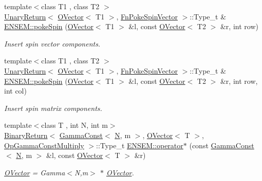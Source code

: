 \begin{DoxyCompactItemize}
{\footnotesize template$<$class T1 , class T2 $>$ }\\\mbox{\hyperlink{structENSEM_1_1UnaryReturn}{Unary\+Return}}$<$ \mbox{\hyperlink{classENSEM_1_1OVector}{O\+Vector}}$<$ T1 $>$, \mbox{\hyperlink{structENSEM_1_1FnPokeSpinVector}{Fn\+Poke\+Spin\+Vector}} $>$\+::Type\+\_\+t \& \mbox{\hyperlink{group__obsvector_gadea0fd5400f7060852f3cd990c3a8ab3}{E\+N\+S\+E\+M\+::poke\+Spin}} (\mbox{\hyperlink{classENSEM_1_1OVector}{O\+Vector}}$<$ T1 $>$ \&l, const \mbox{\hyperlink{classENSEM_1_1OVector}{O\+Vector}}$<$ T2 $>$ \&r, int row)
\begin{DoxyCompactList}\small\item\em Insert spin vector components. \end{DoxyCompactList}\item 
{\footnotesize template$<$class T1 , class T2 $>$ }\\\mbox{\hyperlink{structENSEM_1_1UnaryReturn}{Unary\+Return}}$<$ \mbox{\hyperlink{classENSEM_1_1OVector}{O\+Vector}}$<$ T1 $>$, \mbox{\hyperlink{structENSEM_1_1FnPokeSpinVector}{Fn\+Poke\+Spin\+Vector}} $>$\+::Type\+\_\+t \& \mbox{\hyperlink{group__obsvector_ga8b52874ec438b5bc2c6faef41097b352}{E\+N\+S\+E\+M\+::poke\+Spin}} (\mbox{\hyperlink{classENSEM_1_1OVector}{O\+Vector}}$<$ T1 $>$ \&l, const \mbox{\hyperlink{classENSEM_1_1OVector}{O\+Vector}}$<$ T2 $>$ \&r, int row, int col)
\begin{DoxyCompactList}\small\item\em Insert spin matrix components. \end{DoxyCompactList}\item 
{\footnotesize template$<$class T , int N, int m$>$ }\\\mbox{\hyperlink{structENSEM_1_1BinaryReturn}{Binary\+Return}}$<$ \mbox{\hyperlink{classENSEM_1_1GammaConst}{Gamma\+Const}}$<$ \mbox{\hyperlink{adat__devel_2lib_2hadron_2operator__name__util_8cc_a7722c8ecbb62d99aee7ce68b1752f337}{N}}, m $>$, \mbox{\hyperlink{classENSEM_1_1OVector}{O\+Vector}}$<$ T $>$, \mbox{\hyperlink{structENSEM_1_1OpGammaConstMultiply}{Op\+Gamma\+Const\+Multiply}} $>$\+::Type\+\_\+t \mbox{\hyperlink{group__obsvector_gaae51a4414b6efe2f47cc4c62841aabf9}{E\+N\+S\+E\+M\+::operator$\ast$}} (const \mbox{\hyperlink{classENSEM_1_1GammaConst}{Gamma\+Const}}$<$ \mbox{\hyperlink{adat__devel_2lib_2hadron_2operator__name__util_8cc_a7722c8ecbb62d99aee7ce68b1752f337}{N}}, m $>$ \&l, const \mbox{\hyperlink{classENSEM_1_1OVector}{O\+Vector}}$<$ T $>$ \&r)
\begin{DoxyCompactList}\small\item\em \mbox{\hyperlink{classENSEM_1_1OVector}{O\+Vector}} = Gamma$<$\+N,m$>$ $\ast$ \mbox{\hyperlink{classENSEM_1_1OVector}{O\+Vector}}. \end{DoxyCompactList}\item 

\end{DoxyCompactItemize}
